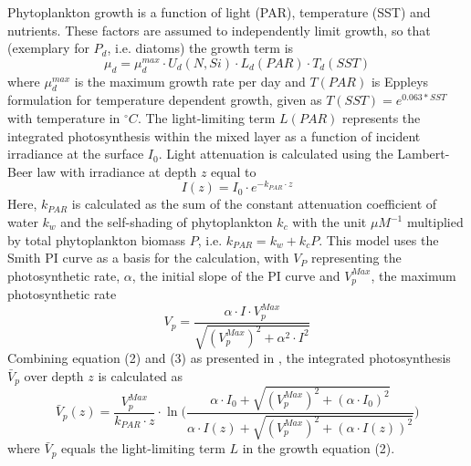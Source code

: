Phytoplankton growth is a function of light (PAR), temperature (SST) and nutrients.
 These factors are assumed to independently limit growth, so that (exemplary for $P_{d}$, i.e. diatoms) the growth term is
\begin{equation}
\mu_{d} = \mu_{d}^{max} \cdot U_{d}(N,Si)\cdot L_{d}(PAR)\cdot T_{d}(SST)
\end{equation}
where $\mu_{d}^{max}$ is the maximum growth rate per day and $T(PAR)$ is Eppleys formulation for temperature dependent growth, given as $T(SST) = e^{0.063 * SST}$ with temperature in $^\circ C$. The light-limiting term $L(PAR)$ represents the integrated photosynthesis within the mixed layer as a function of incident irradiance at the surface $I_0$. Light attenuation is calculated using the Lambert-Beer law with irradiance at depth $z$ equal to
\begin{equation}
I(z) = I_0 \cdot e^{-k_{PAR} \cdot z}
\end{equation}
Here, $k_{PAR}$ is calculated as the sum of the constant attenuation coefficient of water $k_w$ and the self-shading of phytoplankton $k_c$ with the unit $\mu M^{-1}$ multiplied by total phytoplankton biomass $P$, i.e. $k_{PAR} = k_w + k_c P$. This model uses the Smith PI curve as a basis for the calculation, with $V_P$ representing the photosynthetic rate, $\alpha$, the initial slope of the PI curve and $V_p^{Max}$, the maximum photosynthetic rate
\begin{equation}
V_p = \frac{\alpha \cdot I \cdot V_p^{Max}} {\sqrt{(V_p^{Max})^2 + \alpha^2 \cdot I^2}}
\end{equation}
Combining equation (2) and (3) as presented in \cite{Anderson2015}, the integrated photosynthesis $\bar{V}_p$ over depth $z$ is calculated as
\begin{equation}
\bar{V}_p(z) = \frac{V_p^{Max}}{k_{PAR} \cdot z} \cdot \ln \Bigg( \frac{\alpha \cdot I_0 + \sqrt{(V_p^{Max})^2+(\alpha \cdot I_0)^2}} {\alpha \cdot I(z) + \sqrt{(V_p^{Max})^2+(\alpha \cdot I(z))^2}} \Bigg)
\end{equation}
where $\bar{V}_p$ equals the light-limiting term $L$ in the growth equation (2).

